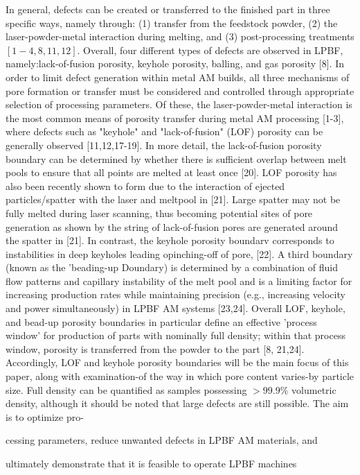 \documentclass[10pt]{article}
\begin{document}
In general, defects can be created or transferred to the finished part in three specific ways, namely through: (1) transfer from the feedstock powder, (2) the laser-powder-metal interaction during melting, and (3) post-processing treatments $[1-4,8,11,12]$. Overall, four different types of defects are observed in LPBF, namely:lack-of-fusion porosity, keyhole porosity, balling, and gas porosity [8]. In order to limit defect generation within metal AM builds, all three mechanisms of pore formation or transfer must be considered and controlled through appropriate selection of processing parameters. Of these, the laser-powder-metal interaction is the most common means of porosity transfer during metal AM processing [1-3], where defects such as "keyhole" and "lack-of-fusion" (LOF) porosity can be generally observed [11,12,17-19]. In more detail, the lack-of-fusion porosity boundary can be determined by whether there is sufficient overlap between melt pools to ensure that all points are melted at least once [20]. LOF porosity has also been recently shown to form due to the interaction of ejected particles/spatter with the laser and meltpool in [21]. Large spatter may not be fully melted during laser scanning, thus becoming potential sites of pore generation as shown by the string of lack-of-fusion pores are generated around the spatter in [21]. In contrast, the keyhole porosity boundarv corresponds to instabilities in deep keyholes leading opinching-off of pore, [22]. A third boundary (known as the 'beading-up Doundary) is determined by a combination of fluid flow patterns and capillary instability of the melt pool and is a limiting factor for increasing production rates while maintaining precision (e.g., increasing velocity and power simultaneously) in LPBF AM systems [23,24]. Overall LOF, keyhole, and bead-up porosity boundaries in particular define an effective 'process window' for production of parts with nominally full density; within that process window, porosity is transferred from the powder to the part [8, 21,24]. Accordingly, LOF and keyhole porosity boundaries will be the main focus of this paper, along with examination-of the way in which pore content varies-by particle size. Full density can be quantified as samples possessing $>99.9 \%$ volumetric density, although it should be noted that large defects are still possible. The aim is to optimize pro-

cessing parameters, reduce unwanted defects in LPBF AM materials, and

ultimately demonstrate that it is feasible to operate LPBF machines
\end{document}
